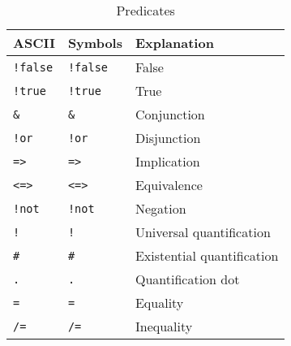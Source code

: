 \begin{EventBNoShortInline}
  \begin{table}[!htbp]
    \centering
    \begin{tabular}{|l|l|l|}
      \hline
      ASCII & Symbols & Explanation \\
      \hline
      \verb$!false$ & \lstinline$!false$ & False \\
      \verb$!true$ & \lstinline$!true$ & True \\
      \verb$&$ & \lstinline$&$ & Conjunction \\
      \verb$!or$ & \lstinline$!or$ & Disjunction \\
      \verb$=>$ & \lstinline$=>$ & Implication \\
      \verb$<=>$ & \lstinline$<=>$ & Equivalence \\
      \verb$!not$ & \lstinline$!not$ & Negation \\
      \verb$!$ & \lstinline$!$ & Universal quantification \\
      \verb$#$ & \lstinline$#$ & Existential quantification \\
      \verb$.$ & \lstinline$.$ & Quantification dot \\
      \verb$=$ & \lstinline$=$ & Equality \\
      \verb$/=$ & \lstinline$/=$ & Inequality \\
      \hline
    \end{tabular}
    \caption{Predicates}
  \end{table}


\end{EventBNoShortInline}
